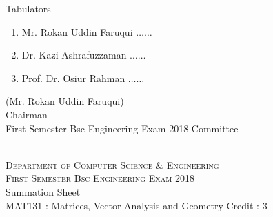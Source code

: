 \documentclass[12pt]{article}
\begin{document}
            \begin{table}[hb]
            	\centering
            \begin{minipage}[b]{0.5\linewidth} %
            {\centering Tabulators }
            \begin{enumerate}
                \item Mr. Rokan Uddin Faruqui \hspace*{1ex} $\ldots \ldots  $  
                \item Dr. Kazi Ashrafuzzaman \hspace*{1ex} $\ldots \ldots  $  
                \item Prof. Dr. Osiur Rahman \hspace*{1ex} $\ldots \ldots $  
            \end{enumerate} 

            \end{minipage}
            \hspace*{1.2cm}
            \begin{minipage}[b]{0.4\linewidth} \centering
            (Mr. Rokan Uddin Faruqui) \\
            Chairman  \hspace*{1ex} \\
           First Semester Bsc Engineering Exam 2018 Committee
            \end{minipage}
            \end{table}
            \clearpage
    \centering
    \begin{minipage}[m]{.8\textwidth} \centering 
	\smallskip
	\\
	\textsc{Department of Computer Science \& Engineering}\\
	\textsc{ First Semester Bsc Engineering Exam 2018}\\
    {\large {\sc Summation Sheet}}\\  
     {\centering MAT131 : Matrices, Vector Analysis and Geometry     Credit : 3 } \\
    \end{minipage} 
\end{document}
